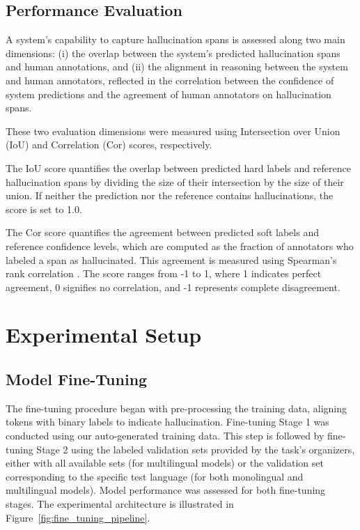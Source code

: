 \documentclass[11pt]{article}
\begin{document}
\subsection{Performance Evaluation}
 A system's capability to capture hallucination spans is assessed along two main dimensions: (i) the overlap between the system’s predicted hallucination spans and human annotations, and (ii) the alignment in reasoning between the system and human annotators, reflected in the correlation between the confidence of system predictions and the agreement of human annotators on hallucination spans.

These two evaluation dimensions were measured using Intersection over Union (IoU) and Correlation (Cor) scores, respectively. 

The IoU score quantifies the overlap between predicted hard labels and reference hallucination spans by dividing the size of their intersection by the size of their union. If neither the prediction nor the reference contains hallucinations, the score is set to 1.0.

The Cor score quantifies the agreement between predicted soft labels and reference confidence levels, which are computed as the fraction of annotators who labeled a span as hallucinated. This agreement is measured using Spearman’s rank correlation \cite{spearman1987proof}. The score ranges from -1 to 1, where 1 indicates perfect agreement, 0 signifies no correlation, and -1 represents complete disagreement.



\section{Experimental Setup}

\subsection{Model Fine-Tuning}
The fine-tuning procedure began with pre-processing the training data, aligning tokens with binary labels to indicate hallucination. Fine-tuning Stage 1 was conducted using our auto-generated training data. This step is followed by fine-tuning Stage 2 using the labeled validation sets provided by the task's organizers, either with all available sets (for multilingual models) or the validation set corresponding to the specific test language (for both monolingual and multilingual models).
Model performance was assessed for both fine-tuning stages. The experimental architecture is illustrated in Figure~\ref{fig:fine_tuning_pipeline}.
\end{document}
